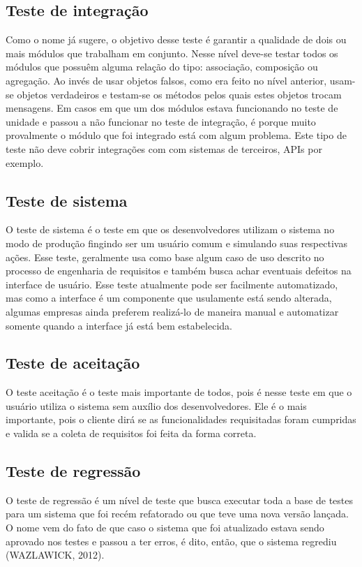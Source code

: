 \documentclass[
    12pt,       %
    openright,      %
    twoside,      %
    a4paper,      %
    english,      %
    french,       %
    spanish,      %
    brazil,       %
    ]{abntex2}
\begin{document}
          \subsection{Teste de integração}
              Como o nome já sugere, o objetivo desse teste é garantir a qualidade de dois ou mais
              módulos que trabalham em conjunto. Nesse nível deve-se testar todos os módulos que possuêm
              alguma relação do tipo: associação, composição ou agregação. Ao invés de usar objetos
              falsos, como era feito no nível anterior, usam-se objetos verdadeiros e testam-se os
              métodos pelos quais estes objetos trocam mensagens. Em casos em que um dos módulos
              estava funcionando no teste de unidade e passou a não funcionar no teste de integração,
              é porque muito provalmente o módulo que foi integrado está com algum problema. Este tipo
              de teste não deve cobrir integrações com com sistemas de terceiros, APIs por exemplo.

          \subsection{Teste de sistema}
              O teste de sistema é o teste em que os desenvolvedores utilizam o sistema no modo de
              produção fingindo ser um usuário comum e simulando suas respectivas ações. Esse teste,
              geralmente usa como base algum caso de uso descrito no processo de engenharia de
              requisitos e também busca achar eventuais defeitos na interface de usuário. Esse
              teste atualmente pode ser facilmente automatizado, mas como a interface é um componente
              que usulamente está sendo alterada, algumas empresas ainda preferem realizá-lo de maneira
              manual e automatizar somente quando a interface já está bem estabelecida.

          \subsection{Teste de aceitação}
              O teste aceitação é o teste mais importante de todos, pois é nesse teste em que o
              usuário utiliza o sistema sem auxílio dos desenvolvedores. Ele é o mais importante,
              pois o cliente dirá se as funcionalidades requisitadas foram cumpridas e valida
              se a coleta de requisitos foi feita da forma correta.

          \subsection{Teste de regressão}
              O teste de regressão é um nível de teste que busca executar toda a base de
              testes para um sistema que foi recém refatorado ou que teve uma nova versão lançada.
              O nome vem do fato de que caso o sistema que foi atualizado estava sendo aprovado
              nos testes e passou a ter erros, é dito, então, que o sistema regrediu (WAZLAWICK, 2012).
\end{document}
